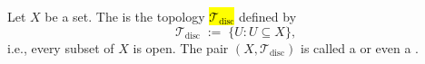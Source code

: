 \begin{definition} \label{definition:discrete_topological_space_of_a_set}
Let $X$ be a set. The  is the topology \hl{$\mathcal{T}_{\mathrm{disc}}$} defined by
\[
\mathcal{T}_{\mathrm{disc}} \;:=\; \{ U : U \subseteq X \},
\]
i.e., every subset of $X$ is open. The pair $(X, \mathcal{T}_{\mathrm{disc}})$ is called a  or even a .
\end{definition}
